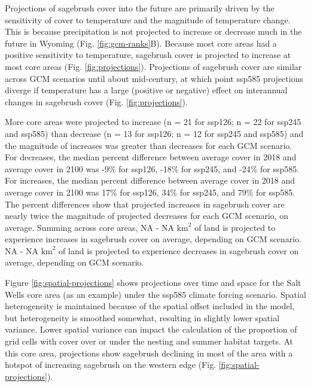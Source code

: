 \documentclass[
  12pt,
]{article}
\begin{document}
Projections of sagebrush cover into the future are primarily driven by the sensitivity of cover to temperature and the magnitude of temperature change.
This is because precipitation is not projected to increase or decrease much in the future in Wyoming (Fig. \ref{fig:gcm-ranks}B).
Because most core areas had a positive sensitivity to temperature, sagebrush cover is projected to increase at most core areas (Fig. \ref{fig:projections}).
Projections of sagebrush cover are similar across GCM scenarios until about mid-century, at which point ssp585 projections diverge if temperature has a large (positive or negative) effect on interannual changes in sagebrush cover (Fig. \ref{fig:projections}).

More core areas were projected to increase (n = 21 for ssp126; n = 22 for ssp245 and ssp585) than decrease (n = 13 for ssp126; n = 12 for ssp245 and ssp585) and the magnitude of increases was greater than decreases for each GCM scenario.
For decreases, the median percent difference between average cover in 2018 and average cover in 2100 was -9\% for ssp126, -18\% for ssp245, and -24\% for ssp585.
For increases, the median percent difference between average cover in 2018 and average cover in 2100 was 17\% for ssp126, 34\% for ssp245, and 79\% for ssp585.
The percent differences show that projected increases in sagebrush cover are nearly twice the magnitude of projected decreases for each GCM scenario, on average.
Summing across core areas, NA - NA \(\text{km}^2\) of land is projected to experience increases in sagebrush cover on average, depending on GCM scenario.
NA - NA \(\text{km}^2\) of land is projected to experience decreases in sagebrush cover on average, depending on GCM scenario.

Figure \ref{fig:spatial-projections} shows projections over time and space for the Salt Wells core area (as an example) under the ssp585 climate forcing scenario.
Spatial heterogeneity is maintained because of the spatial offset included in the model, but heterogeneity is smoothed somewhat, resulting in slightly lower spatial variance.
Lower spatial variance can impact the calculation of the proportion of grid cells with cover over or under the nesting and summer habitat targets.
At this core area, projections show sagebrush declining in most of the area with a hotspot of increasing sagebrush on the western edge (Fig. \ref{fig:spatial-projections}).
\end{document}
